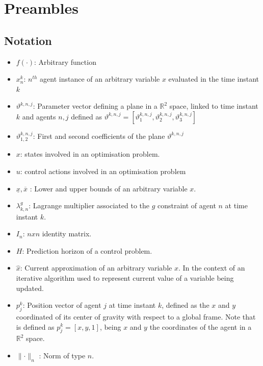 \documentclass[a4paper,fleqn]{cas-sc}
\begin{document}
\section{Preambles}
\label{sec:Preambles}
\subsection{Notation}
\begin{itemize}
    \item $f(\cdot)$: Arbitrary function
    \item $x^k_n$: $n^{th}$ agent instance of an arbitrary variable $x$ evaluated in the time instant $k$ 
    \item $\vartheta^{k,n,j}$: Parameter vector defining a plane in a $\mathbb{R}^2$ space, linked to time instant $k$ and agents $n,j$ defined as $\vartheta^{k,n,j} = [\vartheta_{1}^{k,n,j},\vartheta_{2}^{k,n,j},\vartheta_{3}^{k,n,j}]$
    \item $\vartheta_{1,2}^{k,n,j}$: First and second coefficients of the plane $\vartheta^{k,n,j}$
    \item $x$: states involved in an optimisation problem. 
    \item $u$: control actions involved in an optimisation problem
    \item $\underline{x}, \overline{x}$ : Lower and upper bounds of an arbitrary variable $x$. 
    \item $\lambda^g_{k,n}$: Lagrange multiplier associated to the $g$ constraint of agent $n$ at time instant $k$. 
    \item $I_n$: $nxn$ identity matrix. 
    \item $H$: Prediction horizon of a control problem. 
    \item $\hat x$: Current approximation of an arbitrary variable $x$. In the context of an iterative algorithm used to represent current value of a variable being updated.
    \item $p^{k}_j$: Position vector of agent $j$ at time instant $k$, defined as the $x$ and $y$ coordinated of its center of gravity with respect to a global frame. Note that is defined as $p^{k}_j = [x,y,1]$, being $x$ and $y$ the coordinates of the agent in a $\mathbb{R}^2$ space. 
    \item $\lVert \cdot \rVert_n$ : Norm of type $n$.
\end{itemize}
\end{document}
